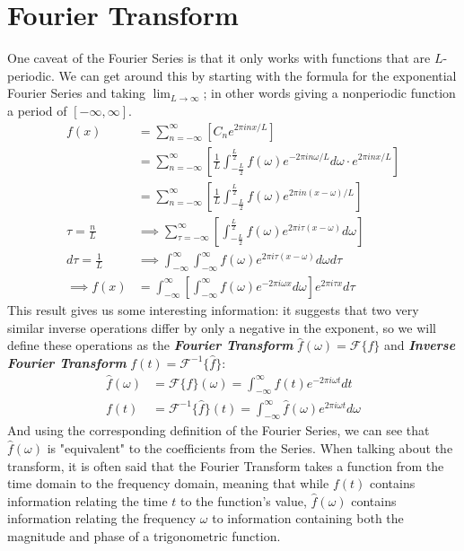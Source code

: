 \documentclass[12pt]{article}
\newcommand{\F}{\mathcal{F}}
\newcommand{\f}[2]{\mathcal{F}\{#1\}(\omega) = \int_{-\infty}^{\infty}#2e^{-2\pi i\omega t}dt}
\newcommand{\finverse}[2]{\mathcal{F}^{-1}\{#1\}(t) = \int_{-\infty}^{\infty}#2e^{2\pi i\omega t}d\omega}
\begin{document}
    \section{Fourier Transform}
    One caveat of the Fourier Series is that it only works with functions that are $L$-periodic. We can get around this by starting with the formula for the exponential Fourier Series and taking $\lim_{L \to \infty}$; in other words giving a nonperiodic function a period of $[-\infty,\infty]$.
    \begin{align}
        f(x) &= \sum_{n = -\infty}^{\infty}\left[ C_n e^{2\pi i n x / L} \right] \\
             &= \sum_{n = -\infty}^{\infty}\left[ \frac{1}{L}\int_{-\frac{L}{2}}^{\frac{L}{2}} f(\omega)e^{-2\pi i n \omega / L}d\omega \cdot e^{2\pi i n x / L}\right] \\
             &= \sum_{n=-\infty}^{\infty}\left[ \frac{1}{L}\int_{-\frac{L}{2}}^{\frac{L}{2}} f(\omega)e^{2\pi i n (x-\omega) / L}\right] \\
        \tau = \frac{n}{L} &\implies \sum_{\tau = -\infty}^{\infty}\left[ \int_{-\frac{L}{2}}^{\frac{L}{2}} f(\omega)e^{2\pi i \tau (x-\omega)}d\omega \right] \\
        d\tau = \frac{1}{L} &\implies \int_{-\infty}^{\infty}\int_{-\infty}^{\infty} f(\omega)e^{2\pi i \tau(x-\omega)}d\omega d\tau \\
        \implies f(x) &= \int_{-\infty}^{\infty}\left[\int_{-\infty}^{\infty} f(\omega)e^{-2\pi i \omega x}d\omega\right] e^{2\pi i \tau x}d\tau
    \end{align}
    This result gives us some interesting information: it suggests that two very similar inverse operations differ by only a negative in the exponent, so we will define these operations as the \textbf{\emph{Fourier Transform}} $\hat{f}(\omega) = \F\{f\}$ and \textbf{\emph{Inverse Fourier Transform}} $f(t) = \F^{-1}\{\hat{f}\}$:
    \begin{align}
        \hat{f}(\omega) &= \f{f}{f(t)} \\
        f(t) &= \finverse{\hat{f}}{\hat{f}(\omega)}
    \end{align}
    And using the corresponding definition of the Fourier Series, we can see that $\hat{f}(\omega)$ is "equivalent" to the coefficients from the Series. When talking about the transform, it is often said that the Fourier Transform takes a function from the time domain to the frequency domain, meaning that while $f(t)$ contains information relating the time  $t$ to the function's value,  $\hat{f}(\omega)$ contains information relating the frequency $\omega$  to information containing both the magnitude and phase of a trigonometric function.
\end{document}
